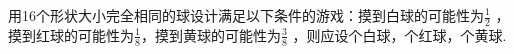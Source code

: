 用16个形状大小完全相同的球设计满足以下条件的游戏：摸到白球的可能性为$\frac{1}{2}$ ，摸到红球的可能性为$\frac{1}{8}$，摸到黄球的可能性为$\frac{3}{8}$ ，则应设\key{\hspace{1cm}}个白球，\key{\hspace{1cm}}个红球，\key{\hspace{1cm}}个黄球.




